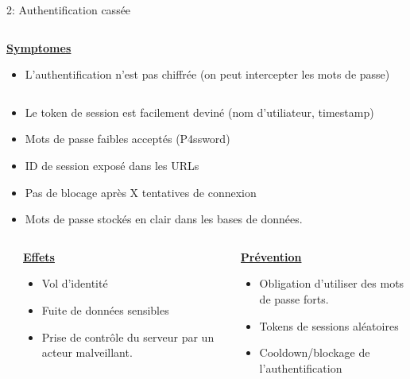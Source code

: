 \documentclass[final,hyperref={pdfpagelabels=false}]{beamer}
\begin{document}
\begin{frame}[t]
\begin{columns}[t]
\begin{column}{.465\textwidth}
\begin{block}{2: Authentification cassée}
\begin{columns}[T]
		\begin{column}{.875\textwidth}
			\uline{\uline{\textbf{Symptomes}}}
			\begin{itemize}
				\item L'authentification n'est pas chiffrée (on peut intercepter les mots de passe)
			\end{itemize}
		\end{column}
	\end{columns}
	\begin{itemize}
		\item Le token de session est facilement deviné (nom d'utiliateur, timestamp)
		\item Mots de passe faibles acceptés (P4ssword)
		\item ID de session exposé dans les URLs
		\item Pas de blocage après X tentatives de connexion
		\item Mots de passe stockés en clair dans les bases de données.
	\end{itemize}
	\begin{columns}[T]
        \begin{column}{.01\textwidth}
		\end{column}
        \begin{column}{0.495\textwidth}
			\vfill
			\uline{\textbf{Effets}}
			\begin{itemize}
				\item Vol d'identité
				\item Fuite de données sensibles
				\item Prise de contrôle du serveur par un acteur malveillant.
			\end{itemize}
			\vfill
		\end{column}
		\begin{column}{0.495\textwidth}
			\vfill
			\uline{\textbf{Prévention}}
			\begin{itemize}
				\item Obligation d'utiliser des mots de passe forts.
				\item Tokens de sessions aléatoires
				\item Cooldown/blockage de l'authentification
			\end{itemize}
		\end{column}
	\end{columns}


\end{block}



\end{column}
\end{columns}
\end{frame}
\end{document}

